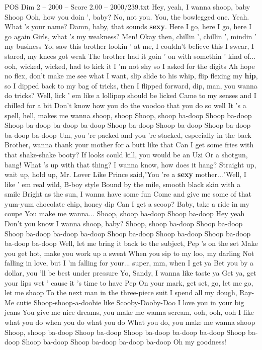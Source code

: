 \begin{textsample}{POS Dim 2 – 2000 – Score 2.00 – 2000/239.txt}  \label{ex:f2_pos_009}
Hey, yeah, I wanna shoop, baby Shoop Ooh, how you doin ', baby?
No, not you.
You, the bowlegged one.
Yeah.
What 's your name?
Damn, baby, that sounds \textbf{sexy}.
Here I go, here I go, here I go again Girls, what 's my weakness?
Men!
Okay then, chillin ', chillin ', mindin ' my business Yo, saw this brother lookin ' at me, I couldn't believe this I swear, I stared, my knees got weak The brother had it goin ' on with somethin ' kind of... ooh, wicked, wicked, had to kick it I 'm not shy so I asked for the digits Ah hope no flex, don't make me see what I want, slip slide to his whip, flip flexing my \textbf{hip}, so I dipped back to my bag of tricks, then I flipped forward, dip, man, you wanna do tricks?
Well, lick ' em like a lollipop should be licked Came to my senses and I chilled for a bit Don't know how you do the voodoo that you do so well It 's a spell, hell, makes me wanna shoop, shoop Shoop, shoop ba-doop Shoop ba-doop Shoop ba-doop ba-doop ba-doop Shoop ba-doop Shoop ba-doop Shoop ba-doop ba-doop ba-doop Um, you 're packed and you 're stacked, especially in the back Brother, wanna thank your mother for a butt like that Can I get some fries with that shake-shake booty?
If looks could kill, you would be an Uzi Or a shotgun, bang!
What 's up with that thing?
I wanna know, how does it hang?
Straight up, wait up, hold up, Mr.
Lover Like Prince said,"You 're a \textbf{sexy} mother..."Well, I like ' em real wild, B-boy style Bound by the mile, smooth black skin with a smile Bright as the sun, I wanna have some fun Come and give me some of that yum-yum chocolate chip, honey dip Can I get a scoop?
Baby, take a ride in my coupe You make me wanna...
Shoop, shoop ba-doop Shoop ba-doop Hey yeah Don't you know I wanna shoop, baby?
Shoop, shoop ba-doop Shoop ba-doop Shoop ba-doop ba-doop ba-doop Shoop ba-doop Shoop ba-doop Shoop ba-doop ba-doop ba-doop Well, let me bring it back to the subject, Pep 's on the set Make you get hot, make you work up a sweat When you sip to my loo, my darling Not falling in love, but I 'm falling for your... super, mm, when I get ya Bet you by a dollar, you 'll be best under pressure Yo, Sandy, I wanna like taste ya Get ya, get your lips wet ' cause it 's time to have Pep On your mark, get set, go, let me go, let me shoop To the next man in the three-piece suit I spend all my dough, Ray-Me cutie Shoop-shoop-a-doobie like Scooby-Dooby-Doo I love you in your big jeans You give me nice dreams, you make me wanna scream, ooh, ooh, ooh I like what you do when you do what you do What you do, you make me wanna shoop Shoop, shoop ba-doop Shoop ba-doop Shoop ba-doop ba-doop ba-doop Shoop ba-doop Shoop ba-doop Shoop ba-doop ba-doop ba-doop Oh my goodness!

\end{textsample}
